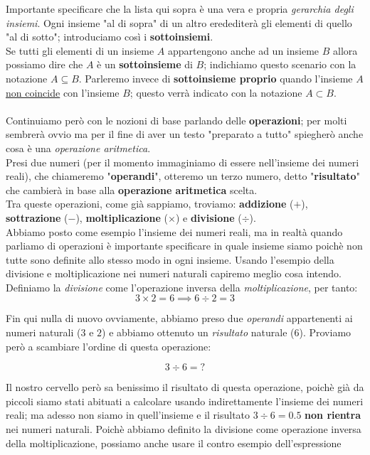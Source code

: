 \documentclass[11pt]{article}
\begin{document}
Importante specificare che la lista qui sopra è una vera e propria \emph{gerarchia degli insiemi}.
Ogni insieme "al di sopra" di un altro eredediterà gli elementi di quello "al di sotto";
introduciamo così i \textbf{sottoinsiemi}. \\
Se tutti gli elementi di un insieme \(A\) appartengono anche ad un insieme \(B\) allora
possiamo dire che \(A\) è un \textbf{sottoinsieme} di \(B\); indichiamo questo scenario
con la notazione \(A \subseteq B\). Parleremo invece di \textbf{sottoinsieme proprio}
quando l'insieme \(A\) \underline{non coincide} con l'insieme \(B\); questo verrà indicato
con la notazione \(A \subset B\).
\\
\\
Continuiamo però con le nozioni di base parlando delle \textbf{operazioni}; 
per molti sembrerà ovvio ma per il fine di aver un testo "preparato a tutto" spiegherò anche
cosa è una \emph{operazione aritmetica}. \\
Presi due numeri (per il momento immaginiamo di essere nell'insieme dei numeri reali),
che chiameremo "\textbf{operandi}", otteremo un terzo numero, detto "\textbf{risultato}" che
cambierà in base alla \textbf{operazione aritmetica} scelta. \\
Tra queste operazioni, come già sappiamo, troviamo: \textbf{addizione} (\(+\)), 
\textbf{sottrazione} (\(-\)), \textbf{moltiplicazione} (\(\times\))
e \textbf{divisione} (\(\div\)). \\
Abbiamo posto come esempio l'insieme dei numeri reali, ma in realtà quando parliamo di operazioni
è importante specificare in quale insieme siamo poichè non tutte sono definite allo stesso
modo in ogni insieme.
Usando l'esempio della divisione e moltiplicazione nei numeri naturali capiremo meglio cosa intendo.
\\
Definiamo la \emph{divisione} come l'operazione inversa della \emph{moltiplicazione}, per tanto:
\[ 3 \times 2 = 6 \implies 6 \div 2 = 3 \]

Fin qui nulla di nuovo ovviamente, abbiamo preso due \emph{operandi} appartenenti ai numeri naturali
(\(3\) e \(2\)) e abbiamo ottenuto un \emph{risultato} naturale (\(6\)). Proviamo però a scambiare
l'ordine di questa operazione:

\[ 3 \div 6 = ? \]

Il nostro cervello però sa benissimo il risultato di questa operazione, poichè già da piccoli siamo
stati abituati a calcolare usando indirettamente l'insieme dei numeri reali; ma adesso non siamo
in quell'insieme e il risultato \(3 \div 6 = 0.5\) \textbf{non rientra} nei numeri naturali.
Poichè abbiamo definito la divisione come operazione inversa della moltiplicazione, possiamo anche
usare il contro esempio dell'espressione
\end{document}
